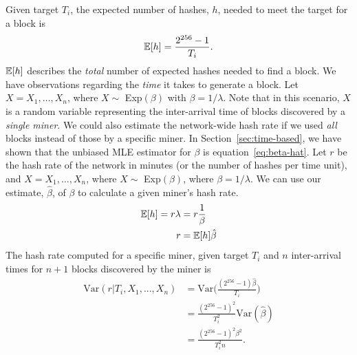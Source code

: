 Given target $T_i$, the expected number of hashes, $h$, needed to meet the target for a block is
\begin{align}
\operatorname{\mathbb{E}}[h] = \frac{2^{256}-1}{T_i}.
\end{align}
$\operatorname{\mathbb{E}}[h]$ describes the \textit{total} number of expected hashes needed to find a block. We have observations regarding the \textit{time} it takes to generate a block. Let $X = X_1, \dots, X_{n}$, where $X \sim$ Exp$(\beta)$ with $\beta = 1/\lambda$. Note that in this scenario, $X$ is a random variable representing the inter-arrival time of blocks discovered by a {\em single miner}. We could also estimate the network-wide hash rate if we used {\em all} blocks instead of those by a specific miner. In Section~\ref{sec:time-based}, we have shown that the unbiased MLE estimator for $\beta$ is equation~\ref{eq:beta-hat}. Let $r$ be the hash rate of the network in minutes (or the number of hashes per time unit), and $X = X_1, \dots, X_{n}$, where $X \sim$ Exp$(\beta)$, where $\beta = 1/\lambda$. We can use our estimate, $\hat{\beta}$, of $\beta$ to calculate a given miner's hash rate.
\begin{align}
\operatorname{\mathbb{E}}[h] = r \lambda &= r \frac{1}{\beta}  \\
r &= \operatorname{\mathbb{E}}[h] \hat{\beta}
\end{align}
The hash rate computed for a specific miner,  
given target $T_i$ and $n$ inter-arrival times for $n+1$ blocks discovered by the miner is 
%
\begin{align}
\text{Var}(r|T_i,X_1,...,X_n) &= \text{Var}\bigg(\frac{(2^{256}-1)\hat{\beta}}{T_i}\bigg) \\
&= \frac{(2^{256}-1)^2}{T_i^2} \text{Var}(\hat{\beta}) \\
&= \frac{(2^{256}-1)^2\beta^2}{T_i^2n}.
\end{align}


